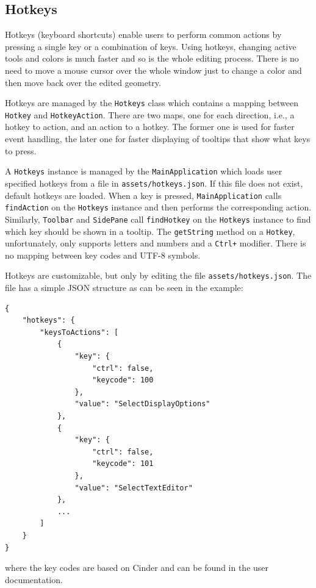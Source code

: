 \subsection{Hotkeys}

Hotkeys (keyboard shortcuts) enable users to perform common actions by pressing a single key or a combination of keys.
Using hotkeys, changing active tools and colors is much faster and so is the whole editing process.
There is no need to move a mouse cursor over the whole window just to change a color and then move back over the edited geometry.

Hotkeys are managed by the \texttt{Hotkeys} class which contains a mapping between \texttt{Hotkey} and \texttt{HotkeyAction}.
There are two maps, one for each direction, i.e., a hotkey to action, and an action to a hotkey.
The former one is used for faster event handling, the later one for faster displaying of tooltips that show what keys to press.

A \texttt{Hotkeys} instance is managed by the \texttt{MainApplication} which loads user specified hotkeys from a file in \texttt{assets/hotkeys.json}.
If this file does not exist, default hotkeys are loaded.
When a key is pressed, \texttt{MainApplication} calls \texttt{findAction} on the \texttt{Hotkeys} instance and then performs the corresponding action.
Similarly, \texttt{Toolbar} and \texttt{SidePane} call \texttt{findHotkey} on the \texttt{Hotkeys} instance to find which key should be shown in a tooltip.
The \texttt{getString} method on a \texttt{Hotkey}, unfortunately, only supports letters and numbers and a \texttt{Ctrl+} modifier.
There is no mapping between key codes and UTF-8 symbols.

Hotkeys are customizable, but only by editing the file \texttt{assets/hotkeys.json}.
The file has a simple JSON structure as can be seen in the example:

\begin{lstlisting}
{
    "hotkeys": {
        "keysToActions": [
            {
                "key": {
                    "ctrl": false,
                    "keycode": 100
                },
                "value": "SelectDisplayOptions"
            },
            {
                "key": {
                    "ctrl": false,
                    "keycode": 101
                },
                "value": "SelectTextEditor"
            },
            ...
        ]
    }
}
\end{lstlisting}
where the key codes are based on Cinder and can be found in the user documentation.

